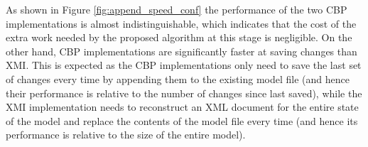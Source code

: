 \documentclass{llncs}
\begin{document}
As shown in Figure \ref{fig:append_speed_conf} the performance of the two CBP implementations is almost indistinguishable, which indicates that the cost of the extra work needed by the proposed algorithm at this stage is negligible. On the other hand, CBP implementations are significantly faster at saving changes than XMI. This is expected as the CBP implementations only need to save the last set of changes every time by appending them to the existing model file (and hence their performance is relative to the number of changes since last saved), while the XMI implementation needs to reconstruct an XML document for the entire state of the model and replace the contents of the model file every time (and hence its performance is relative to the size of the entire model). 


\end{document}
